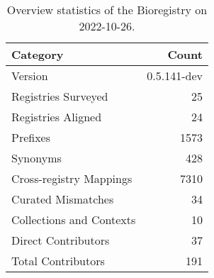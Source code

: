 \begin{table}
\centering
\caption{Overview statistics of the Bioregistry on 2022-10-26.}
\label{tab:bioregistry-summary}
\begin{tabular}{lr}
\toprule
                Category &       Count \\
\midrule
                 Version & 0.5.141-dev \\
     Registries Surveyed &          25 \\
      Registries Aligned &          24 \\
                Prefixes &        1573 \\
                Synonyms &         428 \\
 Cross-registry Mappings &        7310 \\
      Curated Mismatches &          34 \\
Collections and Contexts &          10 \\
     Direct Contributors &          37 \\
      Total Contributors &         191 \\
\bottomrule
\end{tabular}
\end{table}

